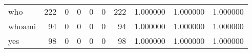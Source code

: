\begin{longtable}{lrrrrrrrrr}
who       &                                                222 &                                                  0 &                                                  0 &                                                  0 &                                                  0 &                                                222 &                                           1.000000 &                               1.000000 &                             1.000000 \\
whoami    &                                                 94 &                                                  0 &                                                  0 &                                                  0 &                                                  0 &                                                 94 &                                           1.000000 &                               1.000000 &                             1.000000 \\
yes       &                                                 98 &                                                  0 &                                                  0 &                                                  0 &                                                  0 &                                                 98 &                                           1.000000 &                               1.000000 &                             1.000000 \\
\end{longtable}
